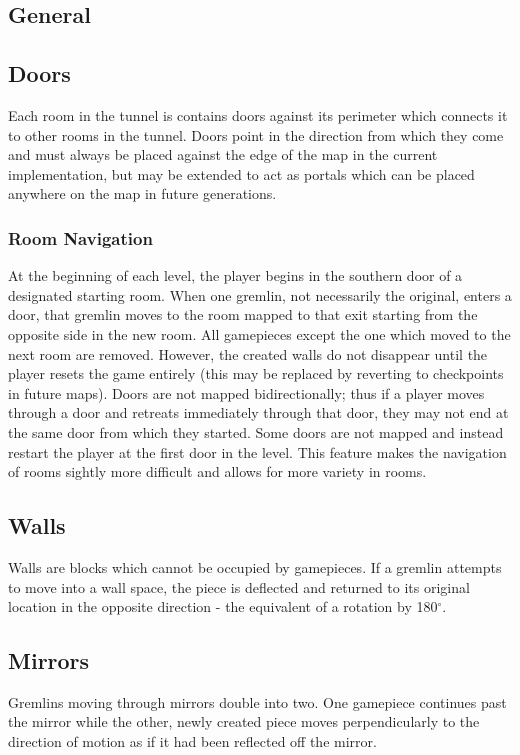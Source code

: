 \documentclass{scrreprt}
\newcommand{\degree}{$^\circ$}
\begin{document}
			\subsection{General}
			
			\subsection{Doors}
				Each room in the tunnel is contains doors against its perimeter which connects it to other rooms in the tunnel. Doors point in the direction from which they come and must always be placed against the edge of the map in the current implementation, but may be extended to act as portals which can be placed anywhere on the map in future generations. 
			
				\subsubsection{Room Navigation}
					At the beginning of each level, the player begins in the southern door of a designated starting room. When one gremlin, not necessarily the original, enters a door, that gremlin moves to the room mapped to that exit starting from the opposite side in the new room. All gamepieces except the one which moved to the next room are removed. However, the created walls do not disappear until the player resets the game entirely (this may be replaced by reverting to checkpoints in future maps). Doors are not mapped bidirectionally; thus if a player moves through a door and retreats immediately through that door, they may not end at the same door from which they started. Some doors are not mapped and instead restart the player at the first door in the level. This feature makes the navigation of rooms sightly more difficult and allows for more variety in rooms. 
			
			\subsection{Walls}
				Walls are blocks which cannot be occupied by gamepieces. If a gremlin attempts to move into a wall space, the piece is deflected and returned to its original location in the opposite direction - the equivalent of a rotation by 180\degree. 
			
			\subsection{Mirrors}
				Gremlins moving through mirrors double into two. One gamepiece continues past the mirror while the other, newly created piece moves perpendicularly to the direction of motion as if it had been reflected off the mirror. 
			
\end{document}
